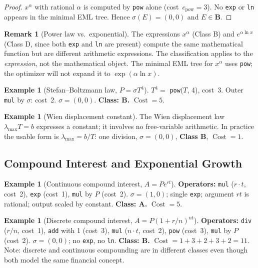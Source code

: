 \documentclass[12pt,a4paper]{article}
\theoremstyle{definition}
\newtheorem{remark}[theorem]{Remark}
\newtheorem{example}[theorem]{Example}
\newcommand{\Cost}{\operatorname{Cost}}
\newcommand{\cpow}{c_{\mathrm{pow}}}
\begin{document}
\begin{proof}
$x^\alpha$ with rational $\alpha$ is computed by \texttt{pow} alone
(cost~$\cpow = 3$).
No \texttt{exp} or \texttt{ln} appears in the minimal EML tree.
Hence $\sigma(E) = (0,0)$ and $E \in \mathbf{B}$.
\end{proof}

\begin{remark}[Power law vs.\ exponential]
The expressions $x^\alpha$ (Class B) and $e^{\alpha \ln x}$ (Class D,
since both \texttt{exp} and \texttt{ln} are present) compute the same
mathematical function but are different arithmetic expressions.
The classification applies to the \emph{expression}, not the
mathematical object.
The minimal EML tree for $x^\alpha$ uses \texttt{pow}; the optimizer
will not expand it to $\exp(\alpha \ln x)$.
\end{remark}

\begin{example}[Stefan--Boltzmann law, $P = \sigma T^4$]
\label{ex:stefan}
$T^4 = $ \texttt{pow}($T$, 4), cost~3.
Outer \texttt{mul} by $\sigma$: cost~2.
$\sigma = (0,0)$.
\textbf{Class: B.}
$\Cost = 5$.
\end{example}

\begin{example}[Wien displacement constant]
\label{ex:wien}
The Wien displacement law $\lambda_{\max} T = b$ expresses a constant;
it involves no free-variable arithmetic.
In practice the usable form is $\lambda_{\max} = b/T$: one division,
$\sigma = (0,0)$, \textbf{Class B}, $\Cost = 1$.
\end{example}

\subsection{Compound Interest and Exponential Growth}

\begin{example}[Continuous compound interest, $A = Pe^{rt}$]
\label{ex:compound}
\textbf{Operators:} \texttt{mul} ($r \cdot t$, cost~2), \texttt{exp}
(cost~1), \texttt{mul} by $P$ (cost~2).
$\sigma = (1,0)$; single \texttt{exp}; argument $rt$ is rational;
output scaled by constant.
\textbf{Class: A.}
$\Cost = 5$.
\end{example}

\begin{example}[Discrete compound interest, $A = P(1 + r/n)^{nt}$]
\label{ex:discrete}
\textbf{Operators:} \texttt{div} ($r/n$, cost~1), \texttt{add} with 1
(cost~3), \texttt{mul} ($n \cdot t$, cost~2), \texttt{pow} (cost~3),
\texttt{mul} by $P$ (cost~2).
$\sigma = (0,0)$; no \texttt{exp}, no \texttt{ln}.
\textbf{Class: B.}
$\Cost = 1 + 3 + 2 + 3 + 2 = 11$.
Note: discrete and continuous compounding are in different classes even
though both model the same financial concept.
\end{example}
\end{document}
